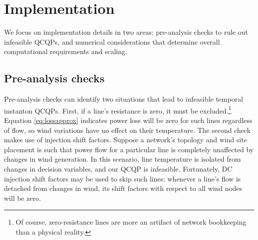 \documentclass[journal,twoside]{IEEEtran}
\begin{document}
\section{Implementation}\label{sec:implementation}
We focus on implementation details in two areas: pre-analysis checks to rule out infeasible QCQPs, and numerical considerations that determine overall computational requirements and scaling.

\subsection{Pre-analysis checks}
Pre-analysis checks can identify two situations that lead to infeasible temporal instanton QCQPs. First, if a line's resistance is zero, it must be excluded.\footnote{Of course, zero-resistance lines are more an artifact of network bookkeeping than a physical reality.} Equation \eqref{eq:lossapprox} indicates power loss will be zero for such lines regardless of flow, so wind variations have no effect on their temperature. The second check makes use of injection shift factors. Suppose a network's topology and wind site placement is such that power flow for a particular line is completely unaffected by changes in wind generation. In this scenario, line temperature is isolated from changes in decision variables, and our QCQP is infeasible. Fortunately, DC injection shift factors may be used to skip such lines: whenever a line's flow is detached from changes in wind, its shift factors with respect to all wind nodes will be zero. 
\end{document}
